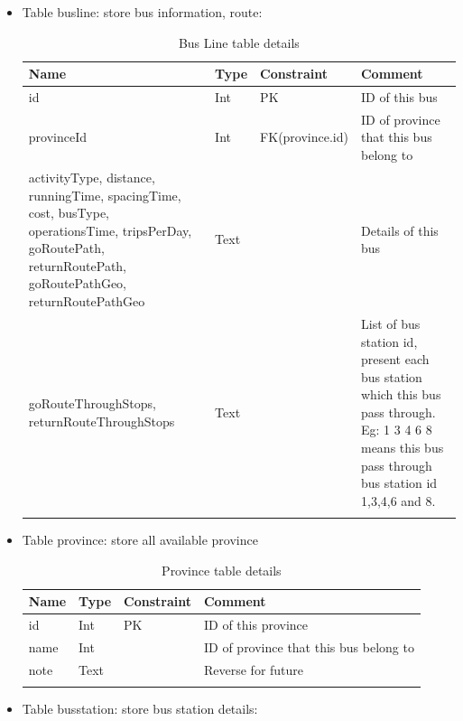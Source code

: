 			\begin{itemize}
				\item{Table busline}: store bus information, route: 
					\begin{center}
						\begin{longtable}{|p{4cm}|p{2cm}|p{3cm}|>{\raggedright\arraybackslash}p{5cm}|} 
							\hline
							\bfseries Name & \bfseries Type & \bfseries Constraint & \bfseries Comment\\ [0.5ex] 
							\hline\hline
							id & Int & PK & ID of this bus \\
							\hline
							provinceId & Int & FK(province.id) & ID of province that this bus belong to \\
							\hline
							activityType, distance, runningTime, spacingTime, cost, busType, operationsTime, tripsPerDay, goRoutePath, returnRoutePath, goRoutePathGeo, returnRoutePathGeo & Text & & Details of this bus \\
							\hline
							goRouteThroughStops, returnRouteThroughStops & Text & & List of bus station id, present each bus station which this bus pass through. Eg: 1 3 4 6 8 means this bus pass through bus station id 1,3,4,6 and 8. \\
							\hline
							\caption{Bus Line table details}	
							\label{table:busline_table} 
						\end{longtable}
					\end{center}
				\item{Table province}: store all available province
					\begin{center}
						\begin{longtable}{|p{4cm}|p{2cm}|p{3cm}|>{\raggedright\arraybackslash}p{5cm}|} 
							\hline
							\bfseries Name & \bfseries Type & \bfseries Constraint & \bfseries Comment\\ [0.5ex] 
							\hline\hline
							id & Int & PK & ID of this province \\
							\hline
							name & Int & & ID of province that this bus belong to \\
							\hline
							note & Text & & Reverse for future \\
							\hline
							\caption{Province table details}	
							\label{table:province_table} 
						\end{longtable}
					\end{center}
				\item{Table busstation}: store bus station details: 
					\begin{center}
						\begin{longtable}{|p{4cm}|p{2cm}|p{3cm}|>{\raggedright\arraybackslash}p{5cm}|} 

\end{longtable}
\end{center}
\end{itemize}
